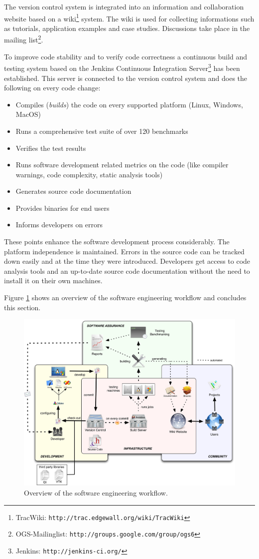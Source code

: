 The version control system is integrated into an information and collaboration website based on a wiki\footnote{TracWiki: \texttt{http://trac.edgewall.org/wiki/TracWiki}} system. The wiki is used for collecting informations such as tutorials, application examples and case studies. Discussions take place in the \ogs mailing list\footnote{OGS-Mailinglist: \texttt{http://groups.google.com/group/ogs6}}.

To improve code stability and to verify code correctness a continuous build and testing system based on the Jenkins Continuous Integration Server\footnote{Jenkins: \texttt{http://jenkins-ci.org/}} has been established. This server is connected to the version control system and does the following on every code change:

\begin{itemize}\addtolength{\itemsep}{-0.3\baselineskip}
\item Compiles (\emph{builds}) the code on every supported platform (Linux, Windows, MacOS)
\item Runs a comprehensive test suite of over 120 benchmarks
\item Verifies the test results
\item Runs software development related metrics on the code (like compiler warnings, code complexity, static analysis tools)
\item Generates source code documentation
\item Provides binaries for end users
\item Informs developers on errors
\end{itemize}

These points enhance the software development process considerably. The platform independence is maintained. Errors in the source code can be tracked down easily and at the time they were introduced. Developers get access to code analysis tools and an up-to-date source code documentation without the need to install it on their own machines.

Figure \ref{fig:lb:engineering-workflow} shows an overview of the software engineering workflow and concludes this section.

\begin{figure}[tb]
\begin{center}
\includegraphics[width=0.99\linewidth]{figures/engineering-workflow}
\caption{Overview of the \ogs software engineering workflow.}
\label{fig:lb:engineering-workflow}
\end{center}
\end{figure}
